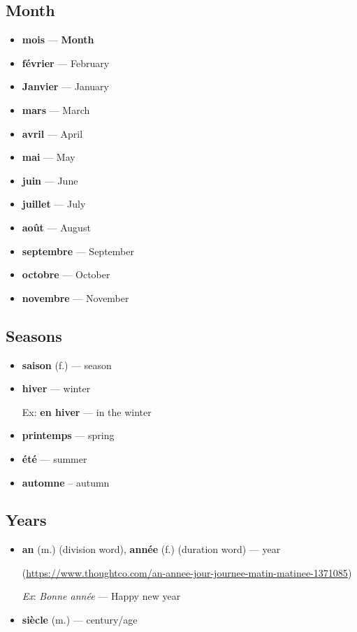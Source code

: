 \documentclass[a4paper,12pt]{article}
\begin{document}
\subsection{Month}
\begin{itemize}
	\item \textbf{mois} --- \textbf{Month}
	\item \textbf{f\'evrier} --- February
	\item \textbf{Janvier} --- January
	\item \textbf{mars} --- March
	\item \textbf{avril} --- April
	\item \textbf{mai} --- May
	\item \textbf{juin} --- June
	\item \textbf{juillet} --- July
	\item \textbf{ao\^ut} --- August
	\item \textbf{septembre} --- September
	\item \textbf{octobre} --- October
	\item \textbf{novembre} --- November
\end{itemize}

\subsection{Seasons}
\begin{itemize}
	\item \textbf{saison} (f.) --- season
	\item \textbf{hiver} --- winter
	\par
	Ex: \textbf{en hiver} --- in the winter
	\item \textbf{printemps} --- spring
	\item \textbf{\'et\'e} --- summer
	\item \textbf{automne} -- autumn
\end{itemize}

\subsection{Years}
\begin{itemize}
\item \textbf{an} (m.) (division word), \textbf{ann\'ee} (f.) (duration word) --- year
\par (\url{https://www.thoughtco.com/an-annee-jour-journee-matin-matinee-1371085})
\par
\textit{Ex}: \textit{Bonne ann\'ee} --- Happy new year
\item \textbf{si\`ecle} (m.) --- century/age
\end{itemize}
\end{document}
